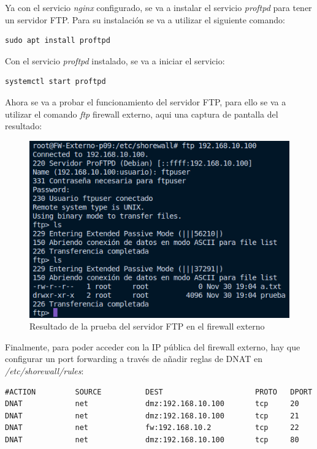 \documentclass[11pt]{report}
\begin{document}
Ya con el servicio \emph{nginx} configurado, se va a instalar el servicio \emph{proftpd} para tener un servidor FTP. Para su instalación
se va a utilizar el siguiente comando:
\begin{BVerbatim}
sudo apt install proftpd
\end{BVerbatim}

Con el servicio \emph{proftpd} instalado, se va a iniciar el servicio:
\begin{BVerbatim}
systemctl start proftpd
\end{BVerbatim}

Ahora se va a probar el funcionamiento del servidor FTP, para ello se va a utilizar el comando \emph{ftp} firewall externo, aqui una
captura de pantalla del resultado:
\begin{figure}[H]
  \centering
  \includegraphics[scale=0.55]{img/ftp.png}
  \caption{Resultado de la prueba del servidor FTP en el firewall externo}
  \label{fig:Resultado de la prueba del servidor FTP en el firewall externo}
\end{figure}

Finalmente, para poder acceder con la IP pública del firewall externo, hay que configurar un port forwarding
a través de añadir reglas de DNAT en \emph{/etc/shorewall/rules}:
\begin{verbatim}
#ACTION         SOURCE          DEST                     PROTO   DPORT
DNAT            net             dmz:192.168.10.100       tcp     20
DNAT            net             dmz:192.168.10.100       tcp     21
DNAT            net             fw:192.168.10.2          tcp     22
DNAT            net             dmz:192.168.10.100       tcp     80
\end{verbatim}
\end{document}
